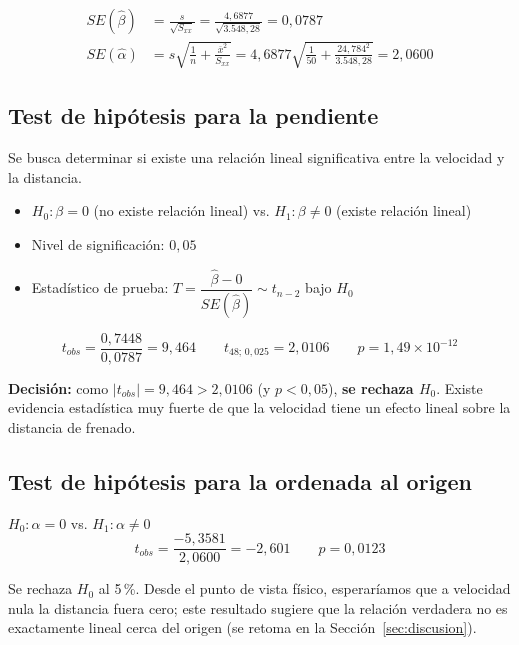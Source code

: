 \documentclass[12pt,a4paper]{article}
\begin{document}
\begin{align}
SE(\hat{\beta}) &= \frac{s}{\sqrt{S_{xx}}} = \frac{4{,}6877}{\sqrt{3.548{,}28}} = 0{,}0787 \\[4pt]
SE(\hat{\alpha}) &= s\sqrt{\frac{1}{n} + \frac{\overline{x}^2}{S_{xx}}} = 4{,}6877\sqrt{\frac{1}{50} + \frac{24{,}784^2}{3.548{,}28}} = 2{,}0600
\end{align}

\subsection{Test de hipótesis para la pendiente}

Se busca determinar si existe una relación lineal significativa entre la velocidad y la distancia.
\begin{itemize}[leftmargin=*]
  \item $H_0: \beta = 0$ (no existe relación lineal) \quad vs. \quad $H_1: \beta \neq 0$ (existe relación lineal)
  \item Nivel de significación: $0{,}05$
  \item Estadístico de prueba: $T = \dfrac{\hat{\beta} - 0}{SE(\hat{\beta})} \sim t_{n-2}$ bajo $H_0$
\end{itemize}

\begin{equation}
t_{obs} = \frac{0{,}7448}{0{,}0787} = 9{,}464 \qquad t_{48;\,0{,}025} = 2{,}0106 \qquad p = 1{,}49 \times 10^{-12}
\end{equation}

\textbf{Decisión:} como $|t_{obs}| = 9{,}464 > 2{,}0106$ (y $p < 0{,}05$), \textbf{se rechaza $H_0$}. Existe evidencia estadística muy fuerte de que la velocidad tiene un efecto lineal sobre la distancia de frenado.

\subsection{Test de hipótesis para la ordenada al origen}

$H_0: \alpha = 0$ \quad vs. \quad $H_1: \alpha \neq 0$
\begin{equation}
t_{obs} = \frac{-5{,}3581}{2{,}0600} = -2{,}601 \qquad p = 0{,}0123
\end{equation}

Se rechaza $H_0$ al 5\,\%. Desde el punto de vista físico, esperaríamos que a velocidad nula la distancia fuera cero; este resultado sugiere que la relación verdadera no es exactamente lineal cerca del origen (se retoma en la Sección~\ref{sec:discusion}).
\end{document}
